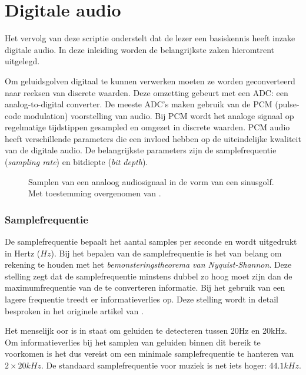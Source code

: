 \section{Digitale audio}

Het vervolg van deze scriptie onderstelt dat de lezer een basiskennis heeft inzake digitale audio. In deze inleiding worden de belangrijkste zaken hieromtrent uitgelegd.

Om geluidsgolven digitaal te kunnen verwerken moeten ze worden geconverteerd naar reeksen van discrete waarden. Deze omzetting gebeurt met een ADC: een analog-to-digital converter. De meeste ADC's maken gebruik van de PCM (pulse-code modulation) voorstelling van audio. Bij PCM wordt het analoge signaal op regelmatige tijdstippen gesampled en omgezet in discrete waarden. PCM audio heeft verschillende parameters die een invloed hebben op de uiteindelijke kwaliteit van de digitale audio. De belangrijkste parameters zijn de samplefrequentie (\textit{sampling rate}) en bitdiepte (\textit{bit depth}).

\begin{figure}[h!]
	\captionsetup{width=0.7\textwidth}
	\caption[Samplen van audio]{Samplen van een analoog audiosignaal in de vorm van een sinusgolf. Met toestemming overgenomen van \cite{tarsosmanual2016}.}
	\begin{center}
		\advance\parskip0.3cm
		
	\end{center}
\end{figure}

\subsubsection{Samplefrequentie}

De samplefrequentie bepaalt het aantal samples per seconde en wordt uitgedrukt in Hertz ($Hz$). Bij het bepalen van de samplefrequentie is het van belang om rekening te houden met het \textit{bemonsteringstheorema van Nyquist-Shannon}. Deze stelling zegt dat de samplefrequentie minstens dubbel zo hoog moet zijn dan de maximumfrequentie van de te converteren informatie. Bij het gebruik van een lagere frequentie treedt er informatieverlies op. Deze stelling wordt in detail besproken in het originele artikel \cite{nyquist1928certain} van \citeauthor{nyquist1928certain}.

Het menselijk oor is in staat om geluiden te detecteren tussen 20Hz en 20kHz. Om informatieverlies bij het samplen van geluiden binnen dit bereik te voorkomen is het dus vereist om een minimale samplefrequentie te hanteren van $ 2 \times 20kHz $. De standaard samplefrequentie voor muziek is net iets hoger: $ 44.1kHz $.

